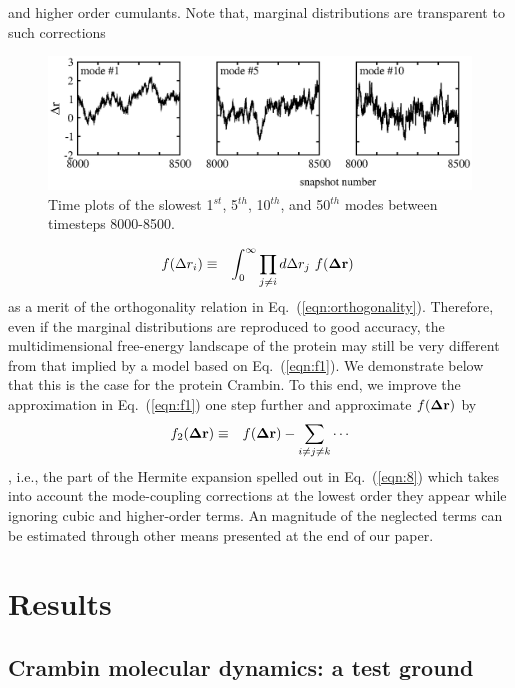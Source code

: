 \documentclass[12pt,article]{iopart}
\begin{document}
and higher order cumulants. Note that, marginal distributions are transparent to
such corrections
\begin{figure}[t!]\centering
\vspace*{0.5in}
  \includegraphics[width=.90\textwidth]{fig2.eps}
\caption{Time plots of the slowest 1$^{st}$, 5$^{th}$, 10$^{th}$, and 50$^{th}$ modes between timesteps 8000-8500.}
\label{fig:timeplots}
\end{figure}
\begin{eqnarray}
\label{marginal}
f(\Delta r_i) &\equiv& \int_0^\infty \prod_{j\ne i}d\Delta r_j\ f({\bf\Delta r})\ 
\end{eqnarray}
as a merit of the orthogonality relation in
Eq.~(\ref{eqn:orthogonality}). Therefore, even if the marginal
distributions are reproduced to good accuracy, the multidimensional
free-energy landscape of the protein may still be very different from
that implied by a model based on Eq.~(\ref{eqn:f1}). We demonstrate
below that this is the case for the protein Crambin. To this end,
we improve the approximation in Eq.~(\ref{eqn:f1}) one step
further and approximate $f({\bf\Delta r})$ by
\begin{eqnarray}
\label{eqn:f2}
f_2({\bf\Delta r}) &\equiv& f({\bf\Delta r}) - \sum_{i\ne j\ne k}\cdots
\end{eqnarray}
, i.e., the part of the Hermite expansion spelled out in
Eq.~(\ref{eqn:8}) which takes into account the mode-coupling
corrections at the lowest order they appear while ignoring cubic and
higher-order terms. An magnitude of the neglected terms can be
estimated through other means presented at the end of our paper.

\section{Results}

\subsection{Crambin molecular dynamics: a test ground}
\end{document}
